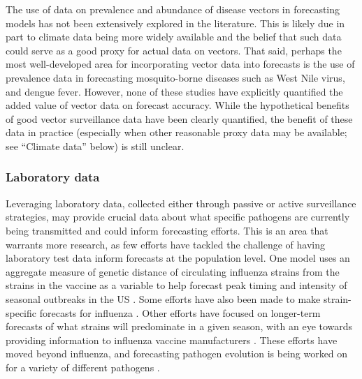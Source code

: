 \documentclass[a4paper]{article}
\begin{document}
The use of data on prevalence and abundance of disease vectors in forecasting models has not been extensively explored in the literature. 
This is likely due in part to climate data being more widely available and the belief that such data could serve as a good proxy for actual data on vectors.
That said, perhaps the most well-developed area for incorporating vector data into forecasts is the use of prevalence data in forecasting mosquito-borne diseases such as West Nile virus\cite{kilpatrick2013predicting,davis2017integrating,Defelice2017}, and dengue fever\cite{shi2015three}. 
However, none of these studies have explicitly quantified the added value of vector data on forecast accuracy.
While the hypothetical benefits of good vector surveillance data have been clearly quantified\cite{yamana2019framework}, the benefit of these data in practice (especially when other reasonable proxy data may be available; see ``Climate data'' below) is still unclear. 

\subsubsection*{Laboratory data} \label{sub:lab}

Leveraging laboratory data, collected either through passive or active surveillance strategies, may provide crucial data about what specific pathogens are currently being transmitted and could inform forecasting efforts.
This is an area that warrants more research, as few efforts have tackled the challenge of having laboratory test data inform forecasts at the population level. 
One model uses an aggregate measure of genetic distance of circulating influenza strains from the strains in the vaccine as a variable to help forecast peak timing and intensity of seasonal outbreaks in the US \cite{Du2017, Du2018}.
Some efforts have also been made to make strain-specific forecasts for influenza \cite{Kandula2017}.
Other efforts have focused on longer-term forecasts of what strains will predominate in a given season, with an eye towards providing information to influenza vaccine manufacturers \cite{Morris2017}.
These efforts have moved beyond influenza, and forecasting pathogen evolution is being worked on for a variety of different pathogens \cite{Hadfield2017}.
\end{document}
